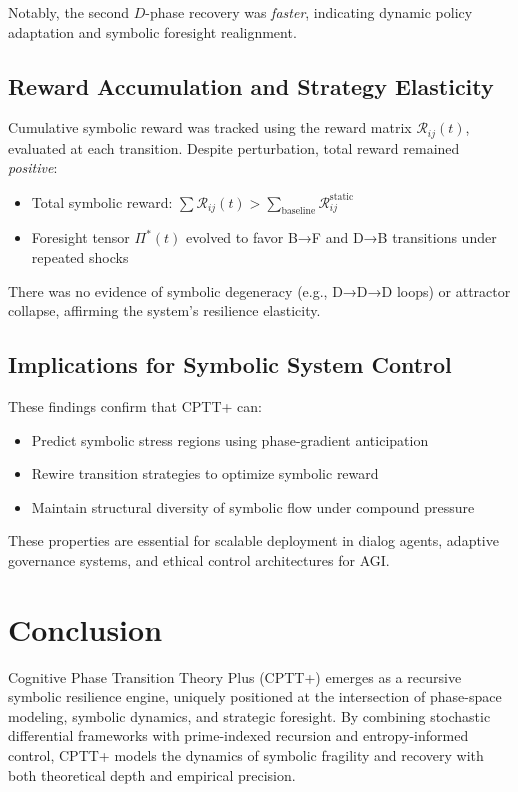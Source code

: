 \documentclass[12pt]{article}
\begin{document}
Notably, the second $D$-phase recovery was \textit{faster}, indicating dynamic policy adaptation and symbolic foresight realignment.

\subsection{Reward Accumulation and Strategy Elasticity}

Cumulative symbolic reward was tracked using the reward matrix $\mathcal{R}_{ij}(t)$, evaluated at each transition. Despite perturbation, total reward remained \textit{positive}:

\begin{itemize}
    \item Total symbolic reward: $\sum \mathcal{R}_{ij}(t) > \sum_{\text{baseline}} \mathcal{R}_{ij}^{\text{static}}$
    \item Foresight tensor $\Pi^*(t)$ evolved to favor B→F and D→B transitions under repeated shocks
\end{itemize}

There was no evidence of symbolic degeneracy (e.g., D→D→D loops) or attractor collapse, affirming the system’s resilience elasticity.

\subsection{Implications for Symbolic System Control}

These findings confirm that CPTT+ can:

\begin{itemize}
    \item Predict symbolic stress regions using phase-gradient anticipation
    \item Rewire transition strategies to optimize symbolic reward
    \item Maintain structural diversity of symbolic flow under compound pressure
\end{itemize}

These properties are essential for scalable deployment in dialog agents, adaptive governance systems, and ethical control architectures for AGI.

\section{Conclusion}

Cognitive Phase Transition Theory Plus (CPTT+) emerges as a recursive symbolic resilience engine, uniquely positioned at the intersection of phase-space modeling, symbolic dynamics, and strategic foresight. By combining stochastic differential frameworks with prime-indexed recursion and entropy-informed control, CPTT+ models the dynamics of symbolic fragility and recovery with both theoretical depth and empirical precision.
\end{document}
